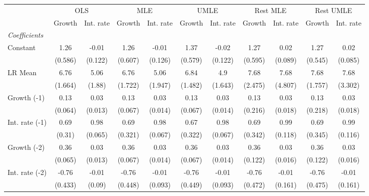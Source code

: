 \begin{table}[htbp] 
	\centering
	\begin{tabular}{@{\extracolsep{4pt}}lcccccccccc@{}}		\hline\hline
		 		 & \multicolumn{2}{c}{OLS} &\multicolumn{2}{c}{MLE} &\multicolumn{2}{c}{UMLE} &\multicolumn{2}{c}{Rest MLE} &\multicolumn{2}{c}{Rest UMLE} \\ 
 		 & Growth 	 & Int. rate 	 & Growth 	 & Int. rate 	 & Growth 	 & Int. rate 	 & Growth 	 & Int. rate 	 & Growth 	 & Int. rate\\\cline{2-3}\cline{4-5}\cline{6-7}\cline{8-9}\cline{10-11}
\rule{0pt}{4ex} 
 \emph{Coefficients} 	  		 & 		 & 		 & 		 & 		 & 		 & 		 & 		 & 		 & 		 &\\ 
\quad Constant 	 & 1.26 	 & -0.01 	 & 1.26 	 & -0.01 	 & 1.37 	 & -0.02 	 & 1.27 	 & 0.02 	 & 1.27 	 & 0.02	 \\ 
 		 & (0.586) 	 & (0.122) 	 & (0.607) 	 & (0.126) 	 & (0.579) 	 & (0.122) 	 & (0.595) 	 & (0.089) 	 & (0.545) 	 & (0.085) 	 \\ 
\quad LR Mean 	 & 6.76 	 & 5.06 	 & 6.76 	 & 5.06 	 & 6.84 	 & 4.9 	 & 7.68 	 & 7.68 	 & 7.68 	 & 7.68	 \\ 
 		 & (1.664) 	 & (1.88) 	 & (1.722) 	 & (1.947) 	 & (1.482) 	 & (1.643) 	 & (2.475) 	 & (4.807) 	 & (1.757) 	 & (3.302) 	 \\ 
\quad Growth (-1) 	 &0.13 	 & 0.03 	 & 0.13 	 & 0.03 	 & 0.13 	 & 0.03 	 & 0.13 	 & 0.03 	 & 0.13 	 & 0.03	 \\ 
 		 & (0.064) 	 & (0.013) 	 & (0.067) 	 & (0.014) 	 & (0.067) 	 & (0.014) 	 & (0.216) 	 & (0.018) 	 & (0.218) 	 & (0.018) 	 \\ 
\quad Int. rate (-1) 	 &0.69 	 & 0.98 	 & 0.69 	 & 0.98 	 & 0.67 	 & 0.98 	 & 0.69 	 & 0.99 	 & 0.69 	 & 0.99	 \\ 
 		 & (0.31) 	 & (0.065) 	 & (0.321) 	 & (0.067) 	 & (0.322) 	 & (0.067) 	 & (0.342) 	 & (0.118) 	 & (0.345) 	 & (0.116) 	 \\ 
\quad Growth (-2) 	 &0.36 	 & 0.03 	 & 0.36 	 & 0.03 	 & 0.36 	 & 0.03 	 & 0.36 	 & 0.03 	 & 0.36 	 & 0.03	 \\ 
 		 & (0.065) 	 & (0.013) 	 & (0.067) 	 & (0.014) 	 & (0.067) 	 & (0.014) 	 & (0.122) 	 & (0.016) 	 & (0.122) 	 & (0.016) 	 \\ 
\quad Int. rate (-2) 	 &-0.76 	 & -0.01 	 & -0.76 	 & -0.01 	 & -0.76 	 & -0.01 	 & -0.76 	 & -0.01 	 & -0.76 	 & -0.01	 \\ 
 		 & (0.433) 	 & (0.09) 	 & (0.448) 	 & (0.093) 	 & (0.449) 	 & (0.093) 	 & (0.472) 	 & (0.161) 	 & (0.475) 	 & (0.161) 	 \\ 

\end{tabular}
\end{table}
